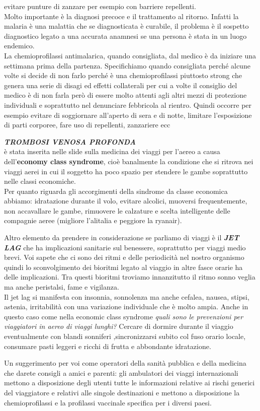 \documentclass[]{article}
\begin{document}
evitare punture di zanzare per esempio con barriere repellenti.\\
Molto importante è la diagnosi precoce e il trattamento al ritorno.
Infatti la malaria è una malattia che se diagnosticata è curabile, il
problema è il sospetto diagnostico legato a una accurata anamnesi se una
persona è stata in un luogo endemico.\\
La chemioprofilassi antimalarica, quando consigliata, dal medico è da
iniziare una settimana prima della partenza. Specifichiamo quando
consigliata perché alcune volte si decide di non farlo perché è una
chemioprofilassi piuttosto strong che genera una serie di disagi ed
effetti collaterali per cui a volte il consiglio del medico è di non
farla però di essere molto attenti agli altri mezzi di protezione
individuali e soprattutto nel denunciare febbricola al rientro. Quindi
occorre per esempio evitare di soggiornare all'aperto di sera e di
notte, limitare l'esposizione di parti corporee, fare uso di repellenti,
zanzariere ecc

\textbf{\emph{TROMBOSI VENOSA PROFONDA}}\\
è stata inserita nelle slide sulla medicina dei viaggi per l'aereo a
causa dell'\textbf{economy class syndrome}, cioè banalmente la
condizione che si ritrova nei viaggi aerei in cui il soggetto ha poco
spazio per stendere le gambe soprattutto nelle classi economiche.\\
Per quanto riguarda gli accorgimenti della sindrome da classe economica
abbiamo: idratazione durante il volo, evitare alcolici, muoversi
frequentemente, non accavallare le gambe, rimuovere le calzature e
scelta intelligente delle compagnie aeree (migliore l'alitalia e
peggiore la ryanair).

Altro elemento da prendere in considerazione se parliamo di viaggi è il
\textbf{\emph{JET LAG}} che ha implicazioni sanitarie sul benessere,
soprattutto per viaggi medio brevi. Voi sapete che ci sono dei ritmi e
delle periodicità nel nostro organismo quindi lo sconvolgimento dei
bioritmi legato al viaggio in altre fasce orarie ha delle implicazioni.
Tra questi bioritmi troviamo innanzitutto il ritmo sonno veglia ma anche
peristalsi, fame e vigilanza.\\
Il jet lag si manifesta con insonnia, sonnolenza ma anche cefalea,
nausea, stipsi, astenia, irritabilità con una variazione individuale che
è molto ampia. Anche in questo caso come nella economic class syndrome
\emph{quali sono le prevenzioni per viaggiatori in aereo di viaggi
lunghi?} Cercare di dormire durante il viaggio eventualmente con blandi
sonniferi ,sincronizzarsi subito col fuso orario locale, consumare pasti
leggeri e ricchi di frutta e abbondante idratazione.

Un suggerimento per voi come operatori della sanità pubblica e della
medicina che darete consigli a amici e parenti: gli ambulatori dei
viaggi internazionali mettono a disposizione degli utenti tutte le
informazioni relative ai rischi generici del viaggiatore e relativi alle
singole destinazioni e mettono a disposizione la chemioprofilassi e la
profilassi vaccinale specifica per i diversi paesi.
\end{document}
